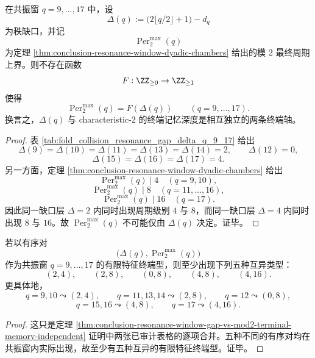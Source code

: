 \begin{theorem}\label{thm:conclusion-resonance-window-gap-vs-mod2-terminal-memory-independent}
在共振窗 \(q=9,\dots,17\) 中，设
\[
\Delta(q):=\bigl(2\lfloor q/2\rfloor+1\bigr)-d_q
\]
为秩缺口，并记
\[
\operatorname{Per}_2^{\max}(q)
\]
为定理 \ref{thm:conclusion-resonance-window-dyadic-chambers} 给出的模 \(2\) 最终周期上界。则不存在函数
\[
F:\ZZ_{\ge 0}\to \ZZ_{\ge 1}
\]
使得
\[
\operatorname{Per}_2^{\max}(q)=F(\Delta(q))
\qquad (q=9,\dots,17).
\]
换言之，\(\Delta(q)\) 与 characteristic-\(2\) 的终端记忆深度是相互独立的两条终端轴。
\end{theorem}

\begin{proof}
表 \ref{tab:fold_collision_resonance_gap_delta_q_9_17} 给出
\[
\Delta(9)=\Delta(10)=\Delta(11)=\Delta(13)=\Delta(14)=2,
\qquad
\Delta(12)=0,
\]
\[
\Delta(15)=\Delta(16)=\Delta(17)=4.
\]
另一方面，定理 \ref{thm:conclusion-resonance-window-dyadic-chambers} 给出
\[
\operatorname{Per}_2^{\max}(q)\mid 4 \quad (q=9,10),
\]
\[
\operatorname{Per}_2^{\max}(q)\mid 8 \quad (q=11,\dots,16),
\]
\[
\operatorname{Per}_2^{\max}(q)\mid 16 \quad (q=17).
\]
因此同一缺口层 \(\Delta=2\) 内同时出现周期级别 \(4\) 与 \(8\)，而同一缺口层 \(\Delta=4\) 内同时出现 \(8\) 与 \(16\)。故 \(\operatorname{Per}_2^{\max}(q)\) 不可能仅由 \(\Delta(q)\) 决定。证毕。
\end{proof}

\begin{corollary}[共振窗至少具有五种有限特征终端型]\label{cor:conclusion-resonance-window-five-terminal-types}
若以有序对
\[
\bigl(\Delta(q),\operatorname{Per}_2^{\max}(q)\bigr)
\]
作为共振窗 \(q=9,\dots,17\) 的有限特征终端型，则至少出现下列五种互异类型：
\[
(2,4),\qquad
(2,8),\qquad
(0,8),\qquad
(4,8),\qquad
(4,16).
\]
更具体地，
\[
q=9,10 \leadsto (2,4),\qquad
q=11,13,14 \leadsto (2,8),\qquad
q=12 \leadsto (0,8),
\]
\[
q=15,16 \leadsto (4,8),\qquad
q=17 \leadsto (4,16).
\]
\end{corollary}

\begin{proof}
这只是定理 \ref{thm:conclusion-resonance-window-gap-vs-mod2-terminal-memory-independent} 证明中两张已审计表格的逐项合并。五种不同的有序对均在共振窗内实际出现，故至少有五种互异的有限特征终端型。证毕。
\end{proof}

